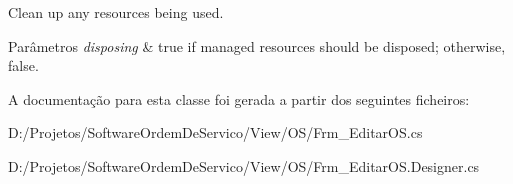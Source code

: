 Clean up any resources being used. 


\begin{DoxyParams}{Parâmetros}
{\em disposing} & true if managed resources should be disposed; otherwise, false.\\
\hline
\end{DoxyParams}


A documentação para esta classe foi gerada a partir dos seguintes ficheiros\+:\begin{DoxyCompactItemize}
\item 
D\+:/\+Projetos/\+Software\+Ordem\+De\+Servico/\+View/\+O\+S/Frm\+\_\+\+Editar\+O\+S.\+cs\item 
D\+:/\+Projetos/\+Software\+Ordem\+De\+Servico/\+View/\+O\+S/Frm\+\_\+\+Editar\+O\+S.\+Designer.\+cs\end{DoxyCompactItemize}
